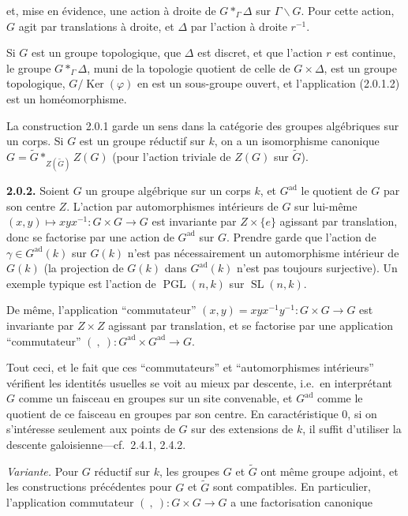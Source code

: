 \documentclass[10pt,a4paper]{article}
\newcommand{\SourcePage}[2]{\clearpage\setcounter{page}{#2}\typeout{D031_SOURCE_PAGE physical=#1 printed=#2}}
\begin{document}
et, mise en évidence, une action à droite de \(G*_{\Gamma}\Delta\) sur \(\Gamma\backslash G\). Pour cette action, \(G\) agit par translations à droite, et \(\Delta\) par l'action à droite \(r^{-1}\).

Si \(G\) est un groupe topologique, que \(\Delta\) est discret, et que l'action \(r\) est continue, le groupe \(G*_{\Gamma}\Delta\), muni de la topologie quotient de celle de \(G\times\Delta\), est un groupe topologique, \(G/\operatorname{Ker}(\varphi)\) en est un sous-groupe ouvert, et l'application (2.0.1.2) est un homéomorphisme.

La construction 2.0.1 garde un sens dans la catégorie des groupes algébriques sur un corps. Si \(G\) est un groupe réductif sur \(k\), on a un isomorphisme canonique \(G=\widetilde G*_{Z(\widetilde G)}Z(G)\) (pour l'action triviale de \(Z(G)\) sur \(\widetilde G\)).

\textbf{2.0.2.} Soient \(G\) un groupe algébrique sur un corps \(k\), et \(G^{\mathrm{ad}}\) le quotient de \(G\) par son centre \(Z\). L'action par automorphismes intérieurs de \(G\) sur lui-même \((x,y)\mapsto xyx^{-1}:G\times G\to G\) est invariante par \(Z\times\{e\}\) agissant par translation, donc se factorise par une action de \(G^{\mathrm{ad}}\) sur \(G\). Prendre garde que l'action de \(\gamma\in G^{\mathrm{ad}}(k)\) sur \(G(k)\) n'est pas nécessairement un automorphisme intérieur de \(G(k)\) (la projection de \(G(k)\) dans \(G^{\mathrm{ad}}(k)\) n'est pas toujours surjective). Un exemple typique est l'action de \(\operatorname{PGL}(n,k)\) sur \(\operatorname{SL}(n,k)\).

De même, l'application ``commutateur'' \((x,y)=xyx^{-1}y^{-1}:G\times G\to G\) est invariante par \(Z\times Z\) agissant par translation, et se factorise par une application ``commutateur'' \((\ ,\ ):G^{\mathrm{ad}}\times G^{\mathrm{ad}}\to G\).

\SourcePage{17}{263}
Tout ceci, et le fait que ces ``commutateurs'' et ``automorphismes intérieurs'' vérifient les identités usuelles se voit au mieux par descente, i.e.~en interprétant \(G\) comme un faisceau en groupes sur un site convenable, et \(G^{\mathrm{ad}}\) comme le quotient de ce faisceau en groupes par son centre. En caractéristique 0, si on s'intéresse seulement aux points de \(G\) sur des extensions de \(k\), il suffit d'utiliser la descente galoisienne---cf.~2.4.1, 2.4.2.

\emph{Variante.} Pour \(G\) réductif sur \(k\), les groupes \(G\) et \(\widetilde G\) ont même groupe adjoint, et les constructions précédentes pour \(G\) et \(\widetilde G\) sont compatibles. En particulier, l'application commutateur \((\ ,\ ):G\times G\to G\) a une factorisation canonique
\end{document}
